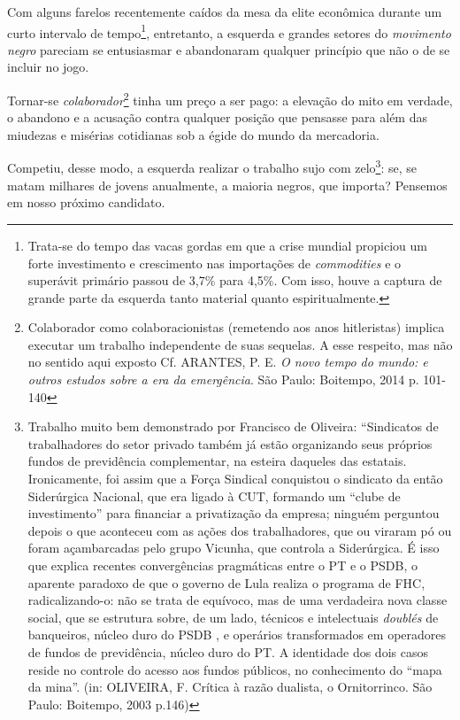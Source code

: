 Com alguns farelos recentemente caídos da mesa da elite econômica
durante um curto intervalo de tempo\footnote{Trata-se do tempo das vacas
  gordas em que a crise mundial propiciou um forte investimento e
  crescimento nas importações de \emph{commodities} e o superávit
  primário passou de 3,7\% para 4,5\%. Com isso, houve a captura de
  grande parte da esquerda tanto material quanto espiritualmente.},
entretanto, a esquerda e grandes setores do \emph{movimento negro}
pareciam se entusiasmar e abandonaram qualquer princípio que não o de se
incluir no jogo.

Tornar-se \emph{colaborador}\footnote{Colaborador como colaboracionistas
  (remetendo aos anos hitleristas) implica executar um trabalho
  independente de suas sequelas. A esse respeito, mas não no sentido
  aqui exposto Cf. ARANTES, P. E. \emph{O novo tempo do mundo: e outros
  estudos sobre a era da emergência}. São Paulo: Boitempo, 2014 p.
  101-140} tinha um preço a ser pago: a elevação do mito em verdade, o
abandono e a acusação contra qualquer posição que pensasse para além das
miudezas e misérias cotidianas sob a égide do mundo da mercadoria.

Competiu, desse modo, a esquerda realizar o trabalho sujo com
zelo\footnote{Trabalho muito bem demonstrado por Francisco de Oliveira:
  ``Sindicatos de trabalhadores do setor privado também já estão
  organizando seus próprios fundos de previdência complementar, na
  esteira daqueles das estatais. Ironicamente, foi assim que a Força
  Sindical conquistou o sindicato da então Siderúrgica Nacional, que era
  ligado à CUT, formando um ``clube de investimento'' para financiar a
  privatização da empresa; ninguém perguntou depois o que aconteceu com
  as ações dos trabalhadores, que ou viraram pó ou foram açambarcadas
  pelo grupo Vicunha, que controla a Siderúrgica. É isso que explica
  recentes convergências pragmáticas entre o PT e o PSDB, o aparente
  paradoxo de que o governo de Lula realiza o programa de FHC,
  radicalizando-o: não se trata de equívoco, mas de uma verdadeira nova
  classe social, que se estrutura sobre, de um lado, técnicos e
  intelectuais \emph{doublés} de banqueiros, núcleo duro do PSDB , e
  operários transformados em operadores de fundos de previdência, núcleo
  duro do PT. A identidade dos dois casos reside no controle do acesso
  aos fundos públicos, no conhecimento do ``mapa da mina''. (in:
  OLIVEIRA, F. Crítica à razão dualista, o Ornitorrinco. São Paulo:
  Boitempo, 2003 p.146)}: se, se matam milhares de jovens anualmente, a
maioria negros, que importa? Pensemos em nosso próximo candidato.

